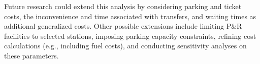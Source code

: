 Future research could extend this analysis by considering parking and ticket costs, the inconvenience and time associated with transfers, and waiting times as additional generalized costs. Other possible extensions include limiting P\&R facilities to selected stations, imposing parking capacity constraints, refining cost calculations (e.g., including fuel costs), and conducting sensitivity analyses on these parameters.